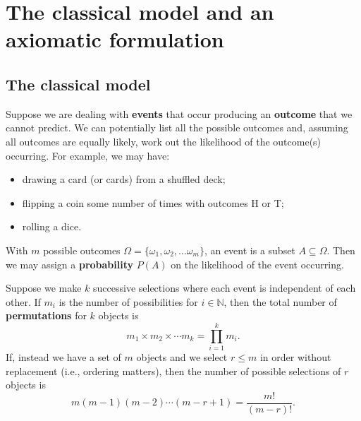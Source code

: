 \documentclass[letter-paper]{tufte-book}
\newcommand\Def[1]{\textbf{#1}}
\begin{document}

\chapter{The classical model and an axiomatic formulation}


\section{The classical model}

Suppose we are dealing with \Def{events} that occur producing an
\Def{outcome} that we cannot predict. We can potentially list all the
possible outcomes and, assuming all outcomes are equally likely, work out the
likelihood of the outcome(s) occurring. For example, we may have:
\begin{itemize}
  \item drawing a card (or cards) from a shuffled deck;
  \item flipping a coin some number of times with outcomes H or T;
  \item rolling a dice.
\end{itemize}
With $m$ possible outcomes $\Omega=\{\omega_1,\omega_2,\ldots\omega_m\}$, an
event is a subset $A\subseteq\Omega$. Then we may assign a
\Def{probability} $P(A)$ on the likelihood of the event occurring.

Suppose we make $k$ successive selections where each event is independent of
each other. If $m_i$ is the number of possibilities for $i\in\mathbb{N}$, then
the total number of \Def{permutations} for $k$ objects is
\begin{equation*}
  m_1\times m_2\times\cdots m_k = \prod_{i=1}^k m_i.
\end{equation*}
If, instead we have a set of $m$ objects and we select $r\leq m$ in order
without replacement (i.e., ordering matters), then the number of possible
selections of $r$ objects is
\begin{equation*}
  m(m-1)(m-2)\cdots(m-r+1)=\frac{m!}{(m-r)!}.
\end{equation*}
\end{document}
